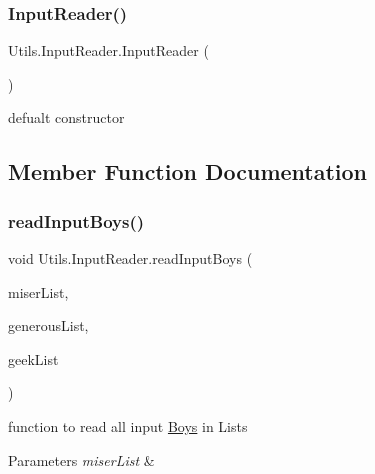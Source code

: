 \subsubsection{\texorpdfstring{Input\+Reader()}{InputReader()}}
{\footnotesize\ttfamily Utils.\+Input\+Reader.\+Input\+Reader (\begin{DoxyParamCaption}{ }\end{DoxyParamCaption})\hspace{0.3cm}{\ttfamily [inline]}}

defualt constructor 

\subsection{Member Function Documentation}
\mbox{\label{class_utils_1_1_input_reader_ab2be313d2fc617f2619432210b00d59d}} 
\subsubsection{\texorpdfstring{read\+Input\+Boys()}{readInputBoys()}}
{\footnotesize\ttfamily void Utils.\+Input\+Reader.\+read\+Input\+Boys (\begin{DoxyParamCaption}\item[{Array\+List$<$ \hyperlink{class_boys_1_1_miser_boy}{Miser\+Boy} $>$}]{miser\+List,  }\item[{Array\+List$<$ \hyperlink{class_boys_1_1_generous_boy}{Generous\+Boy} $>$}]{generous\+List,  }\item[{Array\+List$<$ \hyperlink{class_boys_1_1_geek_boy}{Geek\+Boy} $>$}]{geek\+List }\end{DoxyParamCaption})\hspace{0.3cm}{\ttfamily [inline]}}

function to read all input \hyperlink{namespace_boys}{Boys} in Lists 
\begin{DoxyParams}{Parameters}
{\em miser\+List} & \\
\hline
\end{DoxyParams}
\mbox{\label{class_utils_1_1_input_reader_ae5b928b1a6f7ddf7215a4b19b3c34daf}} 
